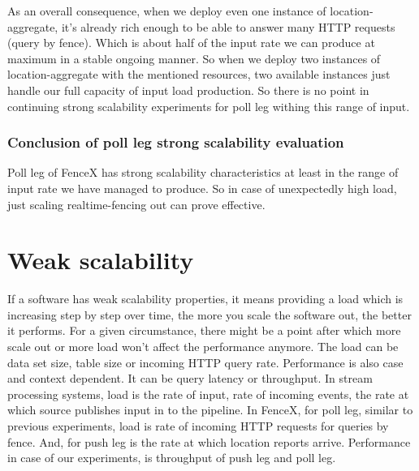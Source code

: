 \documentclass[a4]{report}
\begin{document}
    As an overall consequence, when we deploy even one instance of location-aggregate, it's already rich enough to be
    able to answer many HTTP requests (query by fence).
    Which is about half of the input rate we can produce at maximum in a stable ongoing manner.
    So when we deploy two instances of location-aggregate with the mentioned resources, two available instances just
    handle our full capacity of input load production.
    So there is no point in continuing strong scalability experiments for poll leg withing this range of input.

    \subsubsection{Conclusion of poll leg strong scalability evaluation}
    Poll leg of FenceX has strong scalability characteristics at least in the range of input rate we have managed to
    produce.
    So in case of unexpectedly high load, just scaling realtime-fencing out can prove effective.


    \section{Weak scalability}
    If a software has weak scalability properties, it means providing a load which is increasing step by step over
    time, the more you scale the software out, the better it performs.
    For a given circumstance, there might be a point after which more scale out or more load won't affect
    the performance anymore.
    The load can be data set size, table size or incoming HTTP query rate.
    Performance is also case and context dependent.
    It can be query latency or throughput.
    In stream processing systems, load is the rate of input, rate of incoming events, the rate at
    which source publishes input in to the pipeline.
    In FenceX, for poll leg, similar to previous experiments, load is rate of incoming HTTP requests for queries by
    fence.
    And, for push leg is the rate at which location reports arrive.
    Performance in case of our experiments, is throughput of push leg and poll leg.
\end{document}
